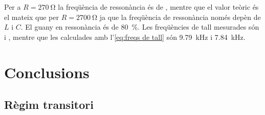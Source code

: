 Per a \( R = \SI{270}{\ohm} \) la freqüència de ressonància és de , mentre que el valor teòric és el mateix que per \( R = \SI{2700}{\ohm} \) ja que la freqüència de ressonància només depèn de \( L \) i \( C \). El guany en ressonància és de \SI{80}{\percent}. Les freqüències de tall mesurades són  i , mentre que les calculades amb l'\cref{eq:freqs de tall} són \SI{9.79}{kHz} i \SI{7.84}{kHz}.   

\section{Conclusions}
\subsection{Règim transitori}

